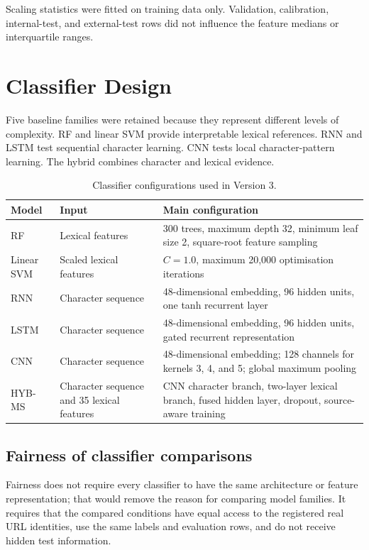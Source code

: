 Scaling statistics were fitted on training data only. Validation, calibration,
internal-test, and external-test rows did not influence the feature medians or
interquartile ranges.

\section{Classifier Design}

Five baseline families were retained because they represent different levels
of complexity. RF and linear SVM provide interpretable lexical references. RNN
and LSTM test sequential character learning. CNN tests local character-pattern
learning. The hybrid combines character and lexical evidence.

\begin{table}[htbp]
\centering
\caption{Classifier configurations used in Version 3.}
\label{tab:method-classifiers}
\small
\begin{tabular}{@{}p{}p{}p{}@{}}
\toprule
Model & Input & Main configuration \\
\midrule
RF & Lexical features & 300 trees, maximum depth 32, minimum leaf size 2, square-root feature sampling \\
Linear SVM & Scaled lexical features & $C=1.0$, maximum 20,000 optimisation iterations \\
RNN & Character sequence & 48-dimensional embedding, 96 hidden units, one tanh recurrent layer \\
LSTM & Character sequence & 48-dimensional embedding, 96 hidden units, gated recurrent representation \\
CNN & Character sequence & 48-dimensional embedding; 128 channels for kernels 3, 4, and 5; global maximum pooling \\
HYB-MS & Character sequence and 35 lexical features & CNN character branch, two-layer lexical branch, fused hidden layer, dropout, source-aware training \\
\bottomrule
\end{tabular}
\end{table}

\subsection{Fairness of classifier comparisons}

Fairness does not require every classifier to have the same architecture or
feature representation; that would remove the reason for comparing model
families. It requires that the compared conditions have equal access to the
registered real URL identities, use the same labels and evaluation rows, and do
not receive hidden test information.

